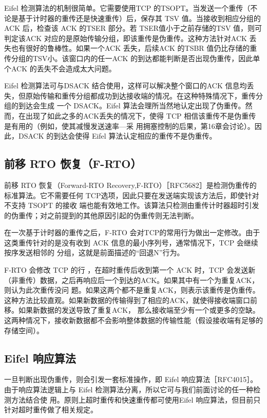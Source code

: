 Eifel 检测算法的机制很简单。它需要使用TCP 的TSOPT。当发送一个重传（不论是基于计时器的重传还是快速重传）后，保存其 TSV 值。当接收到相应分组的ACK 后，检查该
ACK 的TSER 部分。若 TSER值小于之前存储的TSV 值，则可判定该ACK 对应的是原始传输分组，即该重传是伪重传。这种方法针对ACK 丢失也有很好的鲁棒性。如果一个ACK
丢失，后续ACK 的TSBR 值仍比存储的重传分组的TSV小。该窗口内的任一ACK 的到达都能判断是否出现伪重传，因此单个ACK 的丢失不会造成太大问题。

Eifel 检测算法可与DSACK 结合使用，这样可以解决整个窗口的ACK 信息均丢失，但原始传输和重传分组都成功到达接收端的情况。在这种特殊情况下，重传分组的到达会生成
一个 DSACK。Eifel 算法会理所当然地认定出现了伪重传。然而，在出现了如此之多的ACK丢失的情况下，使得 TCP 相信该重传不是伪重传是有用的（例如，使其减慢发送速率—采
用拥塞控制的后果，第16章会讨论）。因此，DSACK 的到达会使得 Eifel 算法认定相应的重传不是伪重传。

\subsection{前移 RTO 恢复（F-RTO）}
前移 RTO 恢复（Forward-RTO Recovery,F-RTO）［RFC5682］是检测伪重传的标准算法。它不需要任何 TCP选项，因此只要在发送端实现该方法后，即使针对不支持 TSOPT 的接收
端也能有效地工作。该算法只检测由重传计时器超时引发的伪重传；对之前提到的其他原因引起的伪重传则无法判断。

在一次基于计时器的重传之后，F-RTO 会对TCP的常用行为做出一定修改。由于这类重传针对的是没有收到 ACK 信息的最小序列号，通常情况下，TCP 会继续按序发送相邻的
分组，这就是前面描述的“回退N”行为。

F-RTO 会修改 TCP 的行 ，在超时重传后收到第一个 ACK 时，TCP 会发送新（非重传）数据，之后再响应后一个到达的ACK。如果其中有一个为重复ACK，则认为此次重传没问
题。如果这两个都不是重复ACK，则表示该重传是伪重传。这种方法比较直观。如果新数据的传输得到了相应的ACK，就使得接收端窗口前移。如果新数据的发送导致了重复ACK，
那么接收端至少有一个或更多的空缺。这两种情况下，接收新数据都不会影响整体数据的传输性能（假设接收端有足够的存储空间）。

\subsection{Eifel 响应算法}
一旦判断出现伪重传，则会引发一套标准操作，即 Eifel 响应算法［RFC4015］。由于响应算法逻辑上与 Eifel 检测算法分离，所以它可与我们前面讨论的任一种检测方法结合使
用。原则上超时重传和快速重传都可使用Eifel 响应算法，但目前只针对超时重传做了相关规定。

